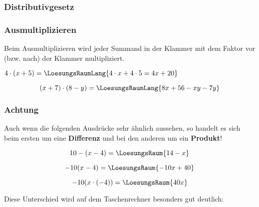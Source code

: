 \subsubsection{Distributivgesetz}

\newpage

\subsubsection{Ausmultiplizieren}
Beim Ausmultiplizieren wird jeder Summand in der Klammer mit dem
Faktor vor (bzw. nach) der Klammer multipliziert.
\begin{beispiel}{}{}

  $4\cdot (x + 5) =\LoesungsRaumLang{4\cdot x + 4\cdot 5 = 4x + 20}$
\end{beispiel}

\begin{beispiel}{}{}
\TRAINER{\\}
  $$(x + 7)\cdot(8-y) = \LoesungsRaumLang{8x+56-xy-7y}$$

\end{beispiel}

\newpage

\subsubsection{Achtung}
Auch wenn die folgenden Ausdrücke sehr ähnlich aussehen, so
handelt es sich beim ersten um eine \textbf{Differenz} und bei den anderen um
ein \textbf{Produkt}!

$$10-(x-4) =\LoesungsRaum{14-x}$$

$$-10(x-4) = \LoesungsRaum{-10x + 40}$$

$$-10(x\cdot{}(-4)) = \LoesungsRaum{40x}$$

Diese Unterschied wird auf dem Taschenrechner besonders gut deutlich:

    

